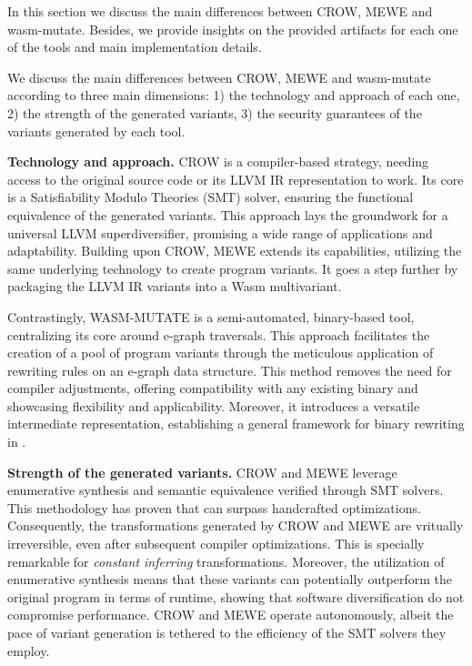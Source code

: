 

In this section we discuss the main differences between CROW, MEWE and wasm-mutate.
Besides, we provide insights on the provided artifacts for each one of the tools and main implementation details.


We discuss the main differences between CROW, MEWE and wasm-mutate according to three main dimensions: 1) the technology and approach of each one, 2) the strength of the generated variants, 3) the security guarantees of the variants generated by each tool.

\textbf{Technology and approach.}
CROW is a compiler-based strategy, needing access to the original source code or its LLVM IR representation to work. 
Its core is a Satisfiability Modulo Theories (SMT) solver, ensuring the functional equivalence of the generated variants.
This approach lays the groundwork for a universal LLVM superdiversifier, promising a wide range of applications and adaptability.
Building upon CROW, MEWE extends its capabilities, utilizing the same underlying technology to create program variants. 
It goes a step further by packaging the LLVM IR variants into a Wasm multivariant.

Contrastingly, WASM-MUTATE is a semi-automated, binary-based tool, centralizing its core around e-graph traversals. 
This approach facilitates the creation of a pool of \Wasm program variants through the meticulous application of rewriting rules on an e-graph data structure. 
This method removes the need for compiler adjustments, offering compatibility with any existing \Wasm binary and showcasing flexibility and applicability. 
Moreover, it introduces a versatile intermediate representation, establishing a general framework for binary rewriting in \Wasm.


\textbf{Strength of the generated variants.}
CROW and MEWE leverage enumerative synthesis and semantic equivalence verified through SMT solvers. 
This methodology has proven that can surpass handcrafted optimizations. 
Consequently, the transformations generated by CROW and MEWE are vritually irreversible, even after subsequent compiler optimizations. 
This is specially remarkable for \emph{constant inferring} transformations.
Moreover, the utilization of enumerative synthesis means that these variants can potentially outperform the original program in terms of runtime, showing that software diversification do not compromise performance. 
CROW and MEWE operate autonomously, albeit the pace of variant generation is tethered to the efficiency of the SMT solvers they employ.

